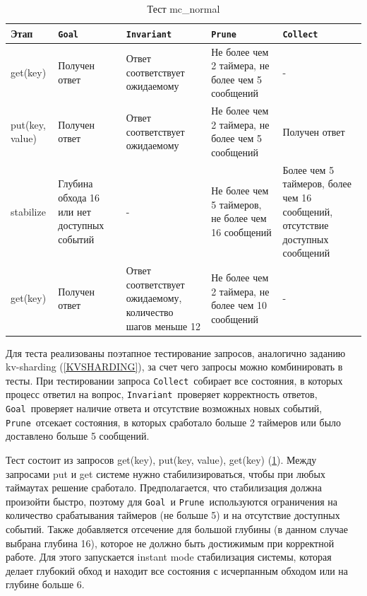 \documentclass[a4paper,12pt]{extarticle}
\newcommand{\goal}[0]{\texttt{Goal}}
\newcommand{\prune}[0]{\texttt{Prune}}
\newcommand{\invariant}[0]{\texttt{Invariant}}
\newcommand{\collect}[0]{\texttt{Collect}}
\begin{document}
\begin{table}[htbp]
    \caption{Тест mc\_normal}
    \begin{center}
        \begin{tabular}{|p{}|p{}|p{}|p{}|p{} |}
            \hline
    Этап & \goal & \invariant & \prune & \collect \\
    \hline
    get(key)  & Получен ответ & Ответ соответствует ожидаемому & Не более чем 2 таймера, не более чем 5 сообщений & - \\
    \hline
    put(key, value)  & Получен ответ & Ответ соответствует ожидаемому & Не более чем 2 таймера, не более чем 5 сообщений & Получен ответ \\
    \hline
    stabilize  & Глубина обхода 16 или нет доступных событий & - & Не более чем 5 таймеров, не более чем 16 сообщений & Более чем 5 таймеров, более чем 16 сообщений, отсутствие доступных сообщений  \\
    \hline
    get(key)  & Получен ответ & Ответ соответствует ожидаемому, количество шагов меньше 12 & Не более чем 2 таймера, не более чем 10 сообщений & - \\
    \hline
    \end{tabular}
    \label{testkvreplication}
    \end{center}
\end{table}


Для теста реализованы поэтапное тестирование запросов, аналогично заданию kv-sharding (\cref{KVSHARDING}), за счет чего запросы можно комбинировать в тесты.
При тестировании запроса \collect\ собирает все состояния, в которых процесс ответил на вопрос, \invariant\ проверяет корректность ответов, \goal\ проверяет наличие ответа и отсутствие возможных новых событий, \prune\ отсекает состояния, в которых сработало больше 2 таймеров или было доставлено больше 5 сообщений.

Тест состоит из запросов get(key), put(key, value), get(key) (\cref{testkvreplication}).
Между запросами put и get системе нужно стабилизироваться, чтобы при любых таймаутах решение сработало.
Предполагается, что стабилизация должна произойти быстро, поэтому для \goal\ и \prune\ используются ограничения на количество срабатывания таймеров (не больше 5) и на отсутствие доступных событий.
Также добавляется отсечение для большой глубины (в данном случае выбрана глубина 16), которое не должно быть достижимым при корректной работе.
Для этого запускается instant mode стабилизация системы, которая делает глубокий обход и находит все состояния с исчерпанным обходом или на глубине больше 6.
\end{document}
